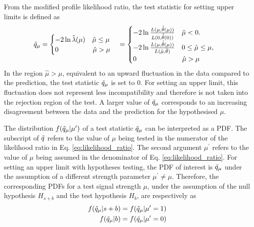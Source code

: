 From the modified profile likelihood ratio, the test statistic for setting upper limits is defined as \cite{asymptotic_test}
\begin{equation}
    \Tilde{q}_\mu = 
    \begin{cases}
        -2\ln\Tilde{\lambda}(\mu)\ \ \ \hat{\mu} \leq \mu 
        \\
        0\ \ \ \ \ \ \ \ \ \ \  \ \ \ \ \hat{\mu} > \mu
    \end{cases}
    = 
    \begin{cases}
        -2\ln\frac{L(\mu, \hat{\hat{\theta}}(\mu) )}{L(0, \hat{\hat{\theta}} (0))}\ \ \ \hat{\mu} < 0. \\
        -2\ln\frac{L(\mu, \hat{\hat{\theta}}(\mu) )}{L(\hat{\mu}, \hat{\theta})}\ \ \ 0 \leq \hat{\mu} \leq \mu, \\
        0\ \ \ \ \ \ \ \ \ \ \ \ \ \ \ \ \ \ \ \ \hat{\mu} > \mu
    \end{cases}
\end{equation}
In the region $\hat{\mu} > \mu$, equivalent to an upward fluctuation in the data compared to the prediction, the test statistic $\Tilde{q}_\mu$ is set to 0.
For setting an upper limit, this fluctuation does not represent less incompatibility and therefore is not taken into the rejection region of the test.
A larger value of $\Tilde{q}_\mu$ corresponds to an increasing disagreement between the data and the prediction for the hypothesised $\mu$.

The distribution $f(\Tilde{q}_{\mu}|\mu^{\prime})$ of a test statistic $\Tilde{q}_\mu$ can be interpreted as a PDF.
The subscript of $\Tilde{q}$ refers to the value of $\mu$ being tested in the numerator of the likelihood ratio in Eq. \ref{eq:likelihood_ratio}. 
The second argument $\mu^{\prime}$ refers to the value of $\mu$ being assumed in the denominator of Eq. \ref{eq:likelihood_ratio}.
For setting an upper limit with hypotheses testing, the PDF of interest is $\Tilde{q}_{\mu}$ under the assumption of a different strength parameter $\mu^{\prime} \neq \mu$.
Therefore, the corresponding PDFs for a test signal strength $\mu$, under the assumption of the null hypothesis $H_{s+b}$ and the test hypothesis $H_b$, are respectively as 
\begin{align}
    f(\Tilde{q}_\mu | s + b ) &= f(\Tilde{q}_\mu | \mu^{\prime} = 1 ) \\
    f(\Tilde{q}_\mu | b ) &= f(\Tilde{q}_\mu | \mu^{\prime} = 0 )
\end{align}

